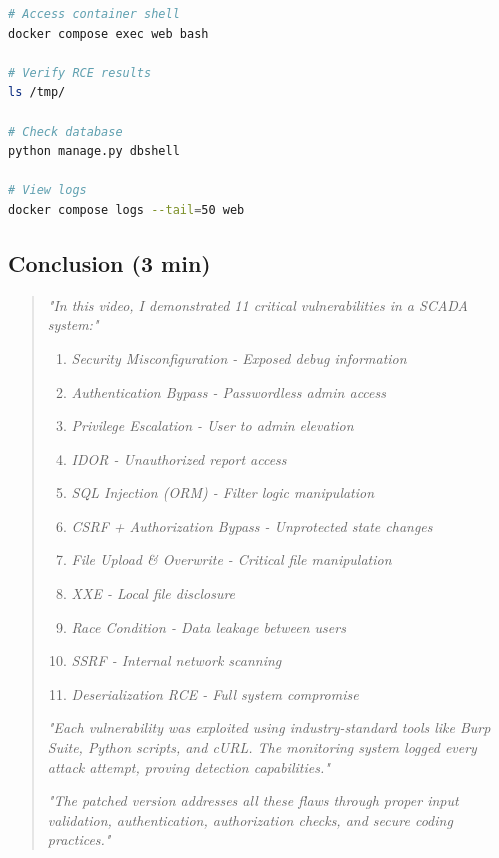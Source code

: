 \documentclass[12pt,a4paper]{article}
\begin{document}
\begin{lstlisting}[language=bash]
# Access container shell
docker compose exec web bash

# Verify RCE results
ls /tmp/

# Check database
python manage.py dbshell

# View logs
docker compose logs --tail=50 web
\end{lstlisting}

\subsection{Conclusion (3 min)}

\begin{quote}
\textit{"In this video, I demonstrated 11 critical vulnerabilities in a SCADA system:"}

\begin{enumerate}
    \item \textit{Security Misconfiguration - Exposed debug information}
    \item \textit{Authentication Bypass - Passwordless admin access}
    \item \textit{Privilege Escalation - User to admin elevation}
    \item \textit{IDOR - Unauthorized report access}
    \item \textit{SQL Injection (ORM) - Filter logic manipulation}
    \item \textit{CSRF + Authorization Bypass - Unprotected state changes}
    \item \textit{File Upload \& Overwrite - Critical file manipulation}
    \item \textit{XXE - Local file disclosure}
    \item \textit{Race Condition - Data leakage between users}
    \item \textit{SSRF - Internal network scanning}
    \item \textit{Deserialization RCE - Full system compromise}
\end{enumerate}

\textit{"Each vulnerability was exploited using industry-standard tools like Burp Suite, Python scripts, and cURL. The monitoring system logged every attack attempt, proving detection capabilities."}

\textit{"The patched version addresses all these flaws through proper input validation, authentication, authorization checks, and secure coding practices."}


\end{quote}
\end{document}
